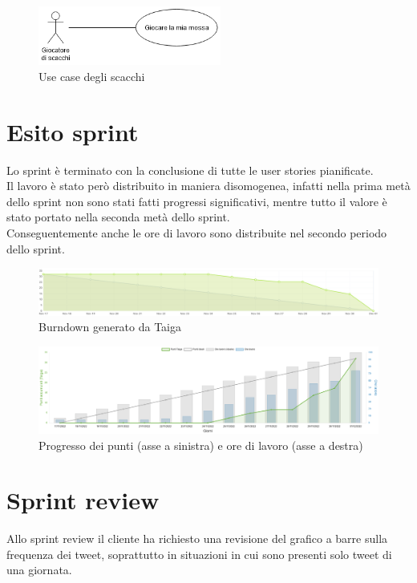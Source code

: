\documentclass[11pt]{article}
\begin{document}
\begin{figure}[H]
    \centering
    \includegraphics[width=6cm]{./img/chess_usecase.png}
    \caption{Use case degli scacchi}
\end{figure}

\newpage
\section*{Esito sprint}
Lo sprint è terminato con la conclusione di tutte le user stories pianificate.\\
Il lavoro è stato però distribuito in maniera disomogenea, infatti nella prima metà dello sprint non sono stati fatti progressi significativi,
mentre tutto il valore è stato portato nella seconda metà dello sprint.\\
Conseguentemente anche le ore di lavoro sono distribuite nel secondo periodo dello sprint.
\begin{figure}[H]
    \centering
    \includegraphics[width=\textwidth]{./img/burndown.png}
    \caption{Burndown generato da Taiga}
\end{figure}

\begin{figure}[H]
    \centering
    \includegraphics[width=\textwidth]{./img/worktime.png}
    \caption{Progresso dei punti (asse a sinistra) e ore di lavoro (asse a destra)}
\end{figure}

\section*{Sprint review}
Allo sprint review il cliente ha richiesto una revisione del grafico a barre sulla frequenza dei tweet, 
soprattutto in situazioni in cui sono presenti solo tweet di una giornata.
\end{document}
